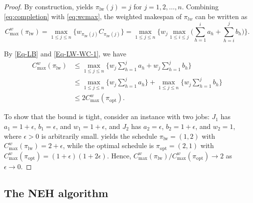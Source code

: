 ﻿\documentclass[12pt]{article} \textheight=24.5cm \textwidth=16.5cm \parskip = 0.165cm
\begin{document}
\begin{sloppypar}
\begin{proof}
            By construction,  yields $\pi_{\mathrm{lw}}(j)=j$ for $j=1, 2, \ldots, n$. Combining \cref{eq:completion} with  \cref{eq:wcmax}, the weighted makespan of $\pi_{lw}$ can be written as 
            \begin{equation}\label{Eq-LW-WC-1}
                C_{\max}^w(\pi_{\mathrm{lw}}) =\max_{1 \leq j \leq n}\Big\{ w_{\pi_{\mathrm{lw}}(j)} C_{\pi_{\mathrm{lw}}(j)}\Big\}=\max_{1 \leq j \leq n} \Big\{w_j \max_{1 \leq i \leq j} \Big (\sum_{h=1}^{i}a_h + \sum_{h=i}^{j}b_h \Big) \Big\}.
            \end{equation}
            
            By \cref{Eq-LB} and \cref{Eq-LW-WC-1}, we have 
            \begin{equation}\label{Eq-LW-WC-2}
                \begin{aligned}
                    C_{\max}^w(\pi_{\mathrm{lw}}) & \leq \max_{1 \leq j \leq n} \Big\{w_j \sum_{h=1}^{j}a_h + w_j \sum_{h=1}^{j}b_h \Big\} \\
                    & \leq \max_{1 \leq j \leq n} \Big\{w_j \sum_{h=1}^{j}a_h \Big\}+\max_{1 \leq j \leq n} \Big\{w_j \sum_{h=1}^{j}b_h \Big\} \\
                    & \leq 2 C_{\max}^w(\pi_{\mathrm{opt}}).
                \end{aligned}
            \end{equation}
            
            To show that the bound is tight, consider an instance with two jobs: $J_1$ has  $a_1=1+\epsilon$, $b_1=\epsilon$, and $w_1= 1+\epsilon$, and $J_2$ has $a_2=\epsilon$, $b_2=1+\epsilon$, and $w_2= 1$, where $\epsilon > 0$ is arbitrarily small.  yields the schedule $\pi_{\mathrm{lw}}=(1,2)$ with $C_{\max}^w(\pi_{\mathrm{lw}})=2+\epsilon$, while the optimal schedule is $\pi_{\mathrm{opt}}=(2,1)$ with $C_{\max}^w(\pi_{\mathrm{opt}})=(1+\epsilon)(1+2\epsilon)$. Hence, $C_{\max}^w(\pi_{\mathrm{lw}})/C_{\max}^w(\pi_{\mathrm{opt}}) \to 2$ as $\epsilon \to 0$.
        \end{proof}
        
        \subsection{The NEH algorithm} \label{sec:neh}
        

\end{sloppypar}
\end{document}
